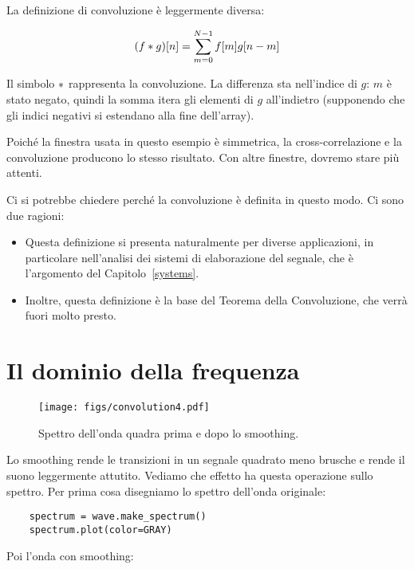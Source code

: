 \documentclass[12pt,a4paper]{book}
\begin{document}
La definizione di convoluzione è leggermente diversa:

%
\[ (f \ast g)[n] = \sum_{m=0}^{N-1} f[m] g[n-m] \] 

%
Il simbolo $\ast$ rappresenta la convoluzione. La differenza sta nell'indice di $g$: $m$ è stato negato, quindi la somma itera gli elementi di $g$ all'indietro (supponendo che gli indici negativi si estendano alla fine dell'array).

Poiché la finestra usata in questo esempio è simmetrica, la cross-correlazione e la convoluzione producono lo stesso risultato. Con altre finestre, dovremo stare più attenti.

Ci si potrebbe chiedere perché la convoluzione è definita in questo modo. Ci sono due ragioni:

\begin{itemize} 

\item Questa definizione si presenta naturalmente per diverse applicazioni, in particolare nell'analisi dei sistemi di elaborazione del segnale, che è l'argomento del Capitolo~\ref{systems}.

\item Inoltre, questa definizione è la base del Teorema della Convoluzione, che verrà fuori molto presto.

\end{itemize} 

\section{Il dominio della frequenza} 

\begin{figure} 

\centerline{\texttt{[image: figs/convolution4.pdf]}} \caption{Spettro dell'onda quadra prima e dopo lo smoothing.} \label{fig.convolution4} \end{figure} 

Lo smoothing rende le transizioni in un segnale quadrato meno brusche e rende il suono leggermente attutito. Vediamo che effetto ha questa operazione sullo spettro. Per prima cosa disegniamo lo spettro dell'onda originale:

\begin{verbatim} 
    spectrum = wave.make_spectrum()
    spectrum.plot(color=GRAY)
 \end{verbatim} 

Poi l'onda con smoothing:
\end{document}
